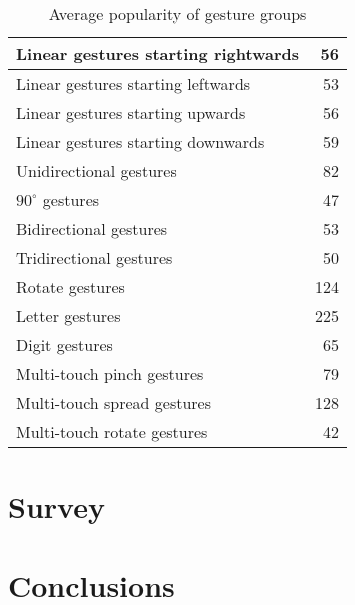 \documentclass{aes130}
\begin{document}
\begin{table} \label{tab:PrelimSurveyAverageGroups}
\begin{center}
\begin{tabular}{|l|r|} \hline

Linear gestures starting rightwards &  56 \\ \hline
Linear gestures starting leftwards  &  53 \\ \hline
Linear gestures starting upwards    &  56 \\ \hline
Linear gestures starting downwards  &  59 \\ \hline \hline

Unidirectional gestures             &  82 \\ \hline
$90^\circ$ gestures                 &  47 \\ \hline
Bidirectional gestures              &  53 \\ \hline
Tridirectional gestures             &  50 \\ \hline \hline

Rotate gestures                     & 124 \\ \hline \hline

Letter gestures                     & 225 \\ \hline
Digit gestures                      &  65 \\ \hline \hline

Multi-touch pinch gestures          &  79 \\ \hline
Multi-touch spread gestures         & 128 \\ \hline
Multi-touch rotate gestures         &  42 \\ \hline

\end{tabular}
\end{center}
\caption{Average popularity of gesture groups}
\end{table}





%


\section{Survey}


\section{Conclusions}



\end{document}
